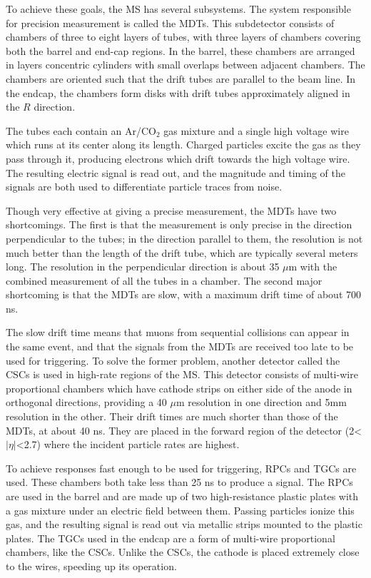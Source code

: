 To achieve these goals, the \ac{MS} has several subsystems. The system responsible for precision measurement is called the \acfp{MDT}. This subdetector consists of chambers of three to eight layers of tubes, with three layers of chambers covering both the barrel and end-cap regions. In the barrel, these chambers are arranged in layers concentric cylinders with small overlaps between adjacent chambers. The chambers are oriented such that the drift tubes are parallel to the beam line. In the endcap, the chambers form disks with drift tubes approximately aligned in the $R$ direction. 

The tubes each contain an Ar/CO$_2$ gas mixture and a single high voltage wire which runs at its center along its length. Charged particles excite the gas as they pass through it, producing electrons which drift towards the high voltage wire. The resulting electric signal is read out, and the magnitude and timing of the signals are both used to differentiate particle traces from noise. 

Though very effective at giving a precise measurement, the \acp{MDT} have two shortcomings. The first is that the measurement is only precise in the direction perpendicular to the tubes; in the direction parallel to them, the resolution is not much better than the length of the drift tube, which are typically several meters long. The resolution in the perpendicular direction is about 35 $\mu$m with the combined measurement of all the tubes in a chamber. The second major shortcoming is that the \acp{MDT} are slow, with a maximum drift time of about 700 ns. 

The slow drift time means that muons from sequential collisions can appear in the same event, and that the signals from the \acp{MDT} are received too late to be used for triggering. To solve the former problem, another detector called the \acp{CSC} is used in high-rate regions of the \ac{MS}. This detector consists of multi-wire proportional chambers which have cathode strips on either side of the anode in orthogonal directions, providing a 40 $\mu$m resolution in one direction and 5mm resolution in the other. Their drift times are much shorter than those of the \acp{MDT}, at about 40 ns. They are placed in the forward region of the detector (2<$|\eta|$<2.7) where the incident particle rates are highest. 

To achieve responses fast enough to be used for triggering, \acp{RPC} and \acp{TGC} are used. These chambers both take less than 25 ns to produce a signal. The \acp{RPC} are used in the barrel and are made up of two high-resistance plastic plates with a gas mixture under an electric field between them. Passing particles ionize this gas, and the resulting signal is read out via metallic strips mounted to the plastic plates. The \acp{TGC} used in the endcap are a form of multi-wire proportional chambers, like the \acp{CSC}. Unlike the \acp{CSC}, the cathode is placed extremely close to the wires, speeding up its operation. 

